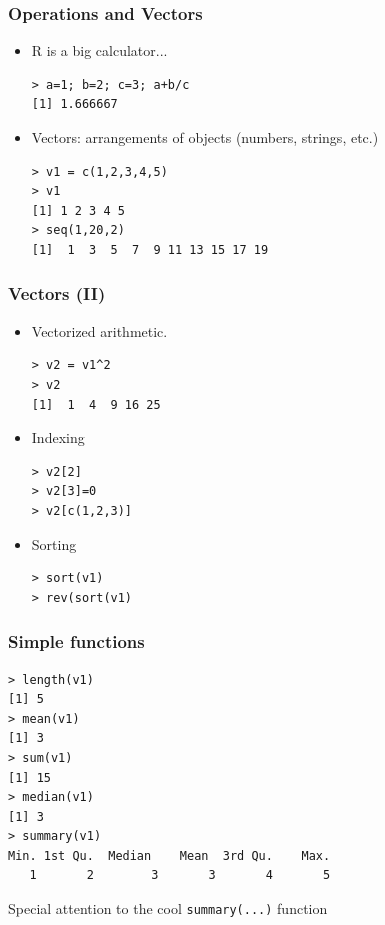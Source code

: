 \documentclass{beamer}
\begin{document}
\begin{frame}[fragile]

\frametitle{Operations and Vectors}
\begin{itemize}
 \item R is a big calculator...\\
 \begin{verbatim}
> a=1; b=2; c=3; a+b/c
[1] 1.666667
  \end{verbatim} 
  \vspace{-0.5cm}
  \item Vectors: arrangements of objects (numbers, strings, etc.)\\
  \begin{verbatim}
> v1 = c(1,2,3,4,5)
> v1
[1] 1 2 3 4 5
> seq(1,20,2)
[1]  1  3  5  7  9 11 13 15 17 19
  \end{verbatim}
  \end{itemize}

\end{frame}


\begin{frame}[fragile]

\frametitle{Vectors (II)}
\begin{itemize}
  \item Vectorized arithmetic.\\
  \begin{verbatim}
> v2 = v1^2
> v2
[1]  1  4  9 16 25
  \end{verbatim}
  \item Indexing
  \begin{verbatim}
> v2[2]
> v2[3]=0
> v2[c(1,2,3)] 
  \end{verbatim}
  \item Sorting
  \begin{verbatim}
> sort(v1)
> rev(sort(v1)
  \end{verbatim}

  \end{itemize}

\end{frame}


\begin{frame}[fragile]

 \frametitle{Simple functions}
 \begin{verbatim}
> length(v1)
[1] 5
> mean(v1)
[1] 3
> sum(v1)
[1] 15
> median(v1)
[1] 3
> summary(v1)
Min. 1st Qu.  Median    Mean  3rd Qu.    Max. 
   1       2        3       3       4       5
 \end{verbatim}
 \vspace{-0.9cm}
 Special attention to the cool \texttt{summary(...)} function

\end{frame}
\end{document}
